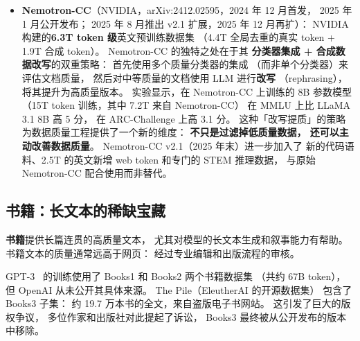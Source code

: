\begin{itemize}[noitemsep]
        某些书写系统（如阿拉伯文、天城文）
        需要特殊的预处理规则。
        2025--2026 年间没有重大新版本发布；
        与之配套的最新 metadata 层是 propella-annotations，
        propella-1 标注器对 FineWeb-2 全集做了 18 维结构化标注，
        是目前对该数据集最丰富的可用元信息。
  \item \textbf{Nemotron-CC}（NVIDIA，arXiv:2412.02595，2024 年 12 月首发，
        2025 年 1 月公开发布；
        2025 年 8 月推出 v2.1 扩展，2025 年 12 月再扩）：
        NVIDIA 构建的\textbf{6.3T token 级}英文预训练数据集
        （4.4T 全局去重的真实 token + 1.9T 合成 token）。
        Nemotron-CC 的独特之处在于其
        \textbf{分类器集成 + 合成数据改写}的双重策略：
        首先使用多个质量分类器的集成
        （而非单个分类器）来评估文档质量，
        然后对中等质量的文档使用 LLM 进行\textbf{改写}
        （rephrasing），将其提升为高质量版本。
        实验显示，在 Nemotron-CC 上训练的 8B 参数模型
        （15T token 训练，其中 7.2T 来自 Nemotron-CC）
        在 MMLU 上比 LLaMA 3.1 8B 高 5 分，
        在 ARC-Challenge 上高 3.1 分。
        这种「改写提质」的策略
        为数据质量工程提供了一个新的维度：
        \textbf{不只是过滤掉低质量数据，
        还可以主动改善数据质量}。
        Nemotron-CC v2.1（2025 年末）进一步加入了
        新的代码语料、2.5T 的英文新增 web token
        和专门的 STEM 推理数据，
        与原始 Nemotron-CC 配合使用而非替代。
\end{itemize}

\subsection{书籍：长文本的稀缺宝藏}

\textbf{书籍}提供长篇连贯的高质量文本，
尤其对模型的长文本生成和叙事能力有帮助。
书籍文本的质量通常远高于网页：
经过专业编辑和出版流程的审核。

GPT-3~\cite{brown2020gpt3} 的训练使用了
Books1 和 Books2 两个书籍数据集
（共约 67B token），
但 OpenAI 从未公开其具体来源。
The Pile（EleutherAI 的开源数据集）
包含了 Books3 子集：
约 19.7 万本书的全文，来自盗版电子书网站。
这引发了巨大的版权争议，
多位作家和出版社对此提起了诉讼，
Books3 最终被从公开发布的版本中移除。

